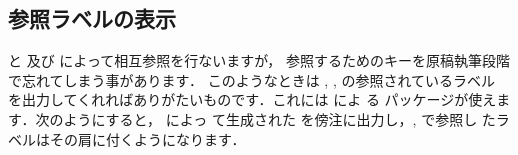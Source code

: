 
\subsection{参照ラベルの表示\zdash{}}

 と  及び  によって相互参照を行ないますが，
参照するためのキーを原稿執筆段階で忘れてしまう事があります．
このようなときは , ,  の参照されているラベル
を出力してくれればありがたいものです．これには によ
る  パッケージが使えます．次のようにすると， によっ
て生成された  を傍注に出力し，,  で参照し
たラベルはその肩に付くようになります．

